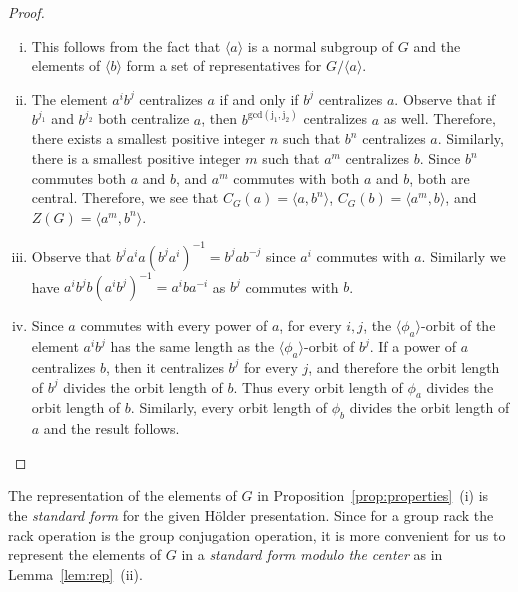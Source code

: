 \documentclass[a4paper,12pt]{article}
\theoremstyle{definition}
\theoremstyle{remark}
\begin{document}
\begin{proof}%
  \begin{enumerate}[(i)]
  \item This follows from the fact that $\langle a \rangle$ is a normal subgroup of $G$ and the elements of $\langle b\rangle$ form a set of representatives for $G/\langle a\rangle$.
  \item The element $a^ib^j$ centralizes $a$ if and only if $b^j$ centralizes $a$. Observe that if $b^{j_1}$ and $b^{j_2}$ both centralize $a$, then $b^{\mathrm{gcd(j_1,j_2)}}$ centralizes $a$ as well. Therefore, there exists a smallest positive integer $n$ such that $b^n$ centralizes $a$. Similarly, there is a smallest positive integer $m$ such that $a^m$ centralizes $b$. Since $b^n$ commutes both $a$ and $b$, and $a^m$ commutes with both $a$ and $b$, both are central.  Therefore, we see that $C_G(a) = \langle a,b^n\rangle$, $C_G(b) = \langle a^m,b\rangle$, and $Z(G) = \langle a^m,b^n\rangle$.
  \item Observe that $b^ja^ia(b^ja^i)^{-1} = b^jab^{-j}$ since $a^i$ commutes with $a$. Similarly we have $a^ib^jb(a^ib^j)^{-1} = a^iba^{-i}$ as $b^j$ commutes with $b$.
  \item Since $a$ commutes with every power of $a$, for every $i,j$, the $\langle\phi_a\rangle$-orbit of the element $a^ib^j$ has the same length as the $\langle\phi_a\rangle$-orbit of $b^j$. If a power of $a$ centralizes $b$, then it centralizes $b^j$ for every $j$, and therefore the orbit length of $b^j$ divides the orbit length of $b$. Thus every orbit length of $\phi_a$ divides the orbit length of $b$. Similarly, every orbit length of $\phi_b$ divides the orbit length of $a$ and the result follows.
  \end{enumerate}
\end{proof}

The representation of the elements of $G$ in Proposition~\ref{prop:properties}~(i) is the \emph{standard form} for the given Hölder presentation. Since for a group rack the rack operation is the group conjugation operation, it is more convenient for us to represent the elements of $G$ in a \emph{standard form modulo the center} as in Lemma~\ref{lem:rep}~(ii).
\end{document}

